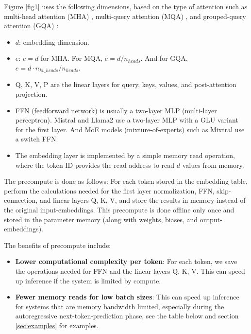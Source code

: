 \documentclass{article}
\begin{document}
Figure \ref{fig1} uses the following dimensions, based on the type of attention such as multi-head attention (MHA) \citep{vanilla}, multi-query attention (MQA) \citep{MQA}, and grouped-query attention (GQA) \citep{GQA}:

\begin{itemize}[topsep=-1pt, itemsep=-1pt]
  \item $d$: embedding dimension.
  \item $e$: $e = d$ for MHA. For MQA, $e = d / n_{heads}$. And for GQA, $e = d \cdot n_{kv\_heads} / n_{heads}$.
  \item Q, K, V, P are the linear layers for query, keys, values, and post-attention projection.
  \item FFN (feedforward network) is usually a two-layer MLP (multi-layer perceptron). Mistral and Llama2 use a two-layer MLP with a GLU variant \citep{GLU} for the first layer. And MoE models (mixture-of-experts) \citep{MoE} such as Mixtral use a switch FFN.
  \item The embedding layer is implemented by a simple memory read operation, where the token-ID provides the read-address to read $d$ values from memory.
\end{itemize}

The precompute is done as follows: For each token stored in the embedding table, perform the calculations needed for the first layer normalization, FFN, skip-connection, and linear layers Q, K, V, and store the results in memory instead of the original input-embeddings. This precompute is done offline only once and stored in the parameter memory (along with weights, biases, and output-embeddings).

The benefits of precompute include:
\begin{itemize}[topsep=-1pt, itemsep=-1pt]
  \item \textbf{Lower computational complexity per token}: For each token, we save the operations needed for FFN and the linear layers Q, K, V. This can speed up inference if the system is limited by compute.
  \item \textbf{Fewer memory reads for low batch sizes}: This can speed up inference for systems that are memory bandwidth limited, especially during the autoregressive next-token-prediction phase, see the table below and section \ref{sec:examples} for examples.
\end{itemize}
\end{document}
